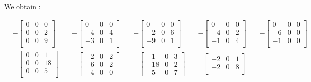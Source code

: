 \documentclass{article}
\begin{document}
	We obtain : 
	
		\[
		\begin{aligned}
			&-\begin{bmatrix}
				0 & 0 & 0 \\
				0 & 0 & 2 \\
				0 & 0 & 9 \\
			\end{bmatrix}
			\quad
			&-\begin{bmatrix}
				 0 & 0 & 0 \\
				-4 & 0 & 4 \\
				-3 & 0 & 1 \\
			\end{bmatrix}
			\quad
			&-\begin{bmatrix}
				 0 & 0 & 0 \\
				-2 & 0 & 6 \\
				-9 & 0 & 1 \\
			\end{bmatrix}
			\quad
			&-\begin{bmatrix}
				 0 & 0 & 0 \\
				-4 & 0 & 2 \\
				-1 & 0 & 4 \\
			\end{bmatrix}
			\quad
			&-\begin{bmatrix}
			 	 0 & 0 & 0 \\
				-6 & 0 & 0 \\
				-1 & 0 & 0 \\
			\end{bmatrix}
			\\
			&-\begin{bmatrix}
				0 & 0 & 1 \\
				0 & 0 & 18 \\
				0 & 0 & 5 \\
			\end{bmatrix}
			\quad
			&-\begin{bmatrix}
				-2 & 0 & 2 \\
				-6 & 0 & 2 \\
				-4 & 0 & 0
			\end{bmatrix}
			\quad
			&-\begin{bmatrix}
				 -1 & 0 & 3\\
				-18 & 0 & 2\\
			 	 -5 & 0 & 7
			\end{bmatrix}
			\quad
			&-\begin{bmatrix}
				-2 & 0 & 1\\
				-2 & 0 & 8\\

\end{bmatrix}
\end{aligned}\]
\end{document}
